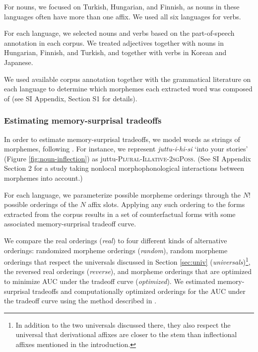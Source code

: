 \documentclass[11pt,letterpaper]{article}
\newcommand{\citet}{\Textcite}
\newcommand{\jd}[1]{\textcolor{Pink}{[jd: #1]}}
\begin{document}




For nouns, we focused on Turkish, Hungarian, and Finnish, as nouns in these languages often have more than one affix.
We used all six languages for verbs.

For each language, we selected nouns and verbs based on the part-of-speech annotation in each corpus.
We treated adjectives together with nouns in Hungarian, Finnish, and Turkish, and together with verbs in Korean and Japanese.

We used available corpus annotation together with the grammatical literature on each language to determine which morphemes each extracted word was composed of (see SI Appendix, Section S1 for details).



\subsubsection{Estimating memory-surprisal tradeoffs}

In order to estimate memory-surprisal tradeoffs, we model words as strings of morphemes, following \citet{Hahn2020modeling}.
For instance, we represent \textit{juttu-i-hi-si} `into your stories' (Figure \ref{fig:noun-inflection}) as juttu-\textsc{Plural}-\textsc{Illative}-\textsc{2sgPoss}.
(See SI Appendix Section 2 for a study taking nonlocal morphophonological interactions between morphemes into account.)

For each language, we parameterize possible morpheme orderings through the $N!$ possible orderings of the $N$ affix slots.
Applying any such ordering to the forms extracted from the corpus results in a set of counterfactual forms with some associated memory-surprisal tradeoff curve.


We compare the real orderings (\textit{real}) to four different kinds of alternative orderings: randomized morpheme orderings (\textit{random}), random morpheme orderings that respect the universals discussed in Section \ref{sec:univ} (\textit{universals})\footnote{In addition to the two universals discussed there, they also respect the universal that derivational affixes are closer to the stem than inflectional affixes mentioned in the introduction.}, the reversed real orderings (\textit{reverse}), and morpheme orderings that are optimized to minimize AUC under the tradeoff curve (\textit{optimized}).  We estimated memory-surprisal tradeoffs and computationally optimized orderings for the AUC under the tradeoff curve using the method described in \citet{Hahn2020modeling}.
\end{document}
